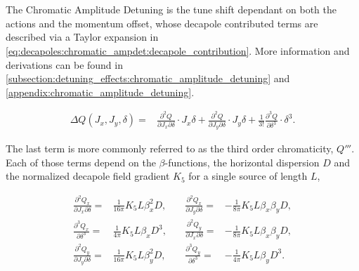 \section{}

The Chromatic Amplitude Detuning is the tune shift dependant on both the actions and the momentum
offset, whose decapole contributed terms are described via a Taylor expansion in
\cref{eq:decapoles:chromatic_ampdet:decapole_contribution}. More information and derivations can
be found in \cref{subsection:detuning_effects:chromatic_amplitude_detuning} and
\cref{appendix:chromatic_amplitude_detuning}.

\begin{equation}
  \begin{aligned}
    \Delta Q(J_x, J_y, \delta) = 
    & \frac{\partial^2Q}{\partial J_x \partial \delta}    \cdot J_x\delta 
    + \frac{\partial^2 Q}{\partial J_y \partial \delta}   \cdot J_y\delta 
    + \frac{1}{3!} \frac{\partial^3 Q}{\partial \delta^3} \cdot \delta^3.
    \end{aligned}
    \label{eq:decapoles:chromatic_ampdet:decapole_contribution}
\end{equation}


The last term is more commonly referred to as the third order chromaticity, $Q'''$.  Each of those
terms depend on the $\beta$-functions, the horizontal dispersion $D$ and the normalized decapole
field gradient $K_5$ for a single source of length $L$,

\begin{equation}\begin{aligned}
  \frac{\partial^2 Q_x}{\partial J_x \partial \delta} =& \frac{1}{16 \pi} K_5L \beta_x^2 D,         &\quad
  \frac{\partial^2 Q_x}{\partial J_y \partial \delta} =& -\frac{1}{8\pi} K_5L \beta_x \beta_y D,
\\
  \frac{\partial^3 Q_x}{\partial \delta^3}            =& \frac{1}{4\pi} K_5L \beta_x D^3,           &\quad
  \frac{\partial^2 Q_y}{\partial J_x \partial \delta} =& -\frac{1}{8\pi} K_5L \beta_x \beta_y D,
\\
  \frac{\partial^2 Q_y}{\partial J_y \partial \delta} =& \frac{1}{16 \pi} K_5L \beta_y^2 D,        &\quad 
  \frac{\partial^3 Q_y}{\partial \delta^3}            =& -\frac{1}{4\pi} K_5L \beta_y D^3.
\end{aligned}\end{equation}

